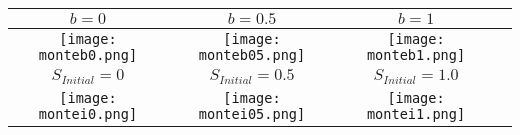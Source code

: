 \begin{table}[H]
{\begin{tabular}{cccc}
\midrule[1.5 pt]
$b=0$&$b=0.5$&$b=1$\\
\midrule[1 pt]
\begin{minipage}{.6\textwidth}\texttt{[image: monteb0.png]}\end{minipage}
&\begin{minipage}{.6\textwidth}\texttt{[image: monteb05.png]}\end{minipage}
&\begin{minipage}{.6\textwidth}\texttt{[image: monteb1.png]}\end{minipage}
\\ 
 
\midrule[1.5 pt]
$S_{Initial}=0$&$S_{Initial}=0.5 $&$S_{Initial}=1.0 $\\
\midrule[1 pt]
\begin{minipage}{.6\textwidth}\texttt{[image: montei0.png]}\end{minipage}
&\begin{minipage}{.6\textwidth}\texttt{[image: montei05.png]}\end{minipage}
&\begin{minipage}{.6\textwidth}\texttt{[image: montei1.png]}\end{minipage}
\\

 
\bottomrule[1.5 pt]
\end{tabular}
}
\end{table}





 




